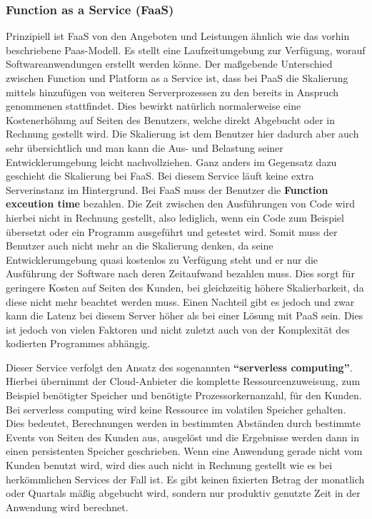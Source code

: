 \subsubsection{Function as a Service (FaaS)}
Prinzipiell ist FaaS von den Angeboten und Leistungen ähnlich wie das vorhin beschriebene Paas-Modell. Es stellt eine Laufzeitumgebung zur Verfügung, worauf Softwareanwendungen erstellt werden könne. Der maßgebende Unterschied zwischen Function und Platform as a Service ist, dass bei PaaS die Skalierung mittels hinzufügen von weiteren Serverprozessen zu den bereits in Anspruch genommenen stattfindet. Dies bewirkt natürlich normalerweise eine Kostenerhöhung auf Seiten des Benutzers, welche direkt Abgebucht oder in Rechnung gestellt wird. Die Skalierung ist dem Benutzer hier dadurch aber auch sehr übersichtlich und man kann die Aus- und Belastung seiner Entwicklerumgebung leicht nachvollziehen.\newline
Ganz anders im Gegensatz dazu geschieht die Skalierung bei FaaS. Bei diesem Service läuft keine extra Serverinstanz im Hintergrund. Bei FaaS muss der Benutzer die \textbf{Function exceution time} bezahlen. Die Zeit zwischen den Ausführungen von Code wird hierbei nicht in Rechnung gestellt, also lediglich, wenn ein Code zum Beispiel übersetzt oder ein Programm ausgeführt und getestet wird. Somit muss der Benutzer auch nicht mehr an die Skalierung denken, da seine Entwicklerumgebung quasi kostenlos zu Verfügung steht und er nur die Ausführung der Software nach deren Zeitaufwand bezahlen muss. Dies sorgt für geringere Kosten auf Seiten des Kunden, bei gleichzeitig höhere Skalierbarkeit, da diese nicht mehr beachtet werden muss. Einen Nachteil gibt es jedoch und zwar kann die Latenz bei diesem Server höher als bei einer Lösung mit PaaS sein. Dies ist jedoch von vielen Faktoren und nicht zuletzt auch von der Komplexität des kodierten Programmes abhängig.

Dieser Service verfolgt den Ansatz des sogenannten \textbf{"`serverless computing"'}. Hierbei übernimmt der Cloud-Anbieter die komplette Ressourcenzuweisung, zum Beispiel benötigter Speicher und benötigte Prozessorkernanzahl, für den Kunden. Bei serverless computing wird keine Ressource im volatilen Speicher gehalten. Dies bedeutet, Berechnungen werden in bestimmten Abständen durch bestimmte Events von Seiten des Kunden aus, ausgelöst und die Ergebnisse werden dann in einen persistenten Speicher geschrieben. Wenn eine Anwendung gerade nicht vom Kunden benutzt wird, wird dies auch nicht in Rechnung gestellt wie es bei herkömmlichen Services der Fall ist. Es gibt keinen fixierten Betrag der monatlich oder Quartals mäßig abgebucht wird, sondern nur produktiv genutzte Zeit in der Anwendung wird berechnet.

